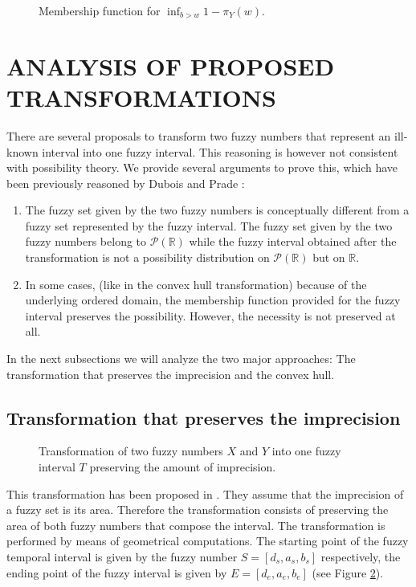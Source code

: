 \documentclass[twoside,twocolumn,a4paper]{article}
\newcommand{\Pow}{\mathcal{P}}
\begin{document}
\begin{figure}[h!]
\centering

\caption{Membership function for $\inf_{b>w}1-\pi_{Y}(w)$.}
\label{fig:interval_membership_nec_b}
\end{figure}

\section{\label{sec:analysis}ANALYSIS OF PROPOSED TRANSFORMATIONS}

There are several proposals to transform two fuzzy numbers that represent an ill-known interval into one fuzzy interval. This reasoning is however not consistent with possibility theory. We provide several arguments to prove this, which have been previously reasoned by Dubois and Prade \cite{Dubois88b}:

\begin{enumerate}
\item
The fuzzy set given by the two fuzzy numbers is conceptually different from a fuzzy set represented by the fuzzy interval. The fuzzy set given by the two fuzzy numbers belong to $\Pow(\mathbb{R})$ while the fuzzy interval obtained after the transformation is not a possibility distribution on $\Pow(\mathbb{R})$  but on $\mathbb{R}$.
\item
In some cases, (like in the convex hull transformation) because of the underlying ordered domain, the membership function provided for the fuzzy interval preserves the possibility. However, the necessity is not preserved at all.
\end{enumerate}

In the next subsections we will analyze the two major approaches: The transformation that preserves the imprecision and the convex hull. 




\subsection{\label{subsubsec:transf-pres-imp}Transformation that preserves the imprecision}
\begin{figure}[h!]
  \centering
  
  \caption{Transformation of two fuzzy numbers $X$ and $Y$ into one fuzzy interval $T$ preserving the amount of imprecision.}
  \label{fig:transf-pres-imp}
\end{figure}
This transformation has been proposed in \cite{Garrido2009}. They assume that the imprecision of a fuzzy set is its area. Therefore the transformation consists of preserving the area of both fuzzy numbers that compose the interval. The transformation is performed by means of geometrical computations. The starting point of the fuzzy temporal interval is given by the fuzzy number $S = [d_s,a_s,b_s]$ respectively, the ending point of the fuzzy interval is given by $E = [d_e,a_e,b_e]$ (see Figure \ref{fig:transf-pres-imp}).
\end{document}
